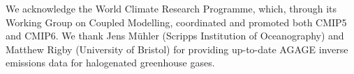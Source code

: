 \documentclass[gmd, manuscript]{copernicus}
\begin{document}
\begin{acknowledgements}
We acknowledge the World Climate Research Programme, which, through its Working Group on Coupled Modelling, coordinated and promoted both CMIP5 and CMIP6. We thank Jens M{\"u}hler (Scripps Institution of Oceanography) and Matthew Rigby (University of Bristol) for providing up-to-date AGAGE inverse emissions data for halogenated greenhouse gases.
\end{acknowledgements}




















\end{document}
